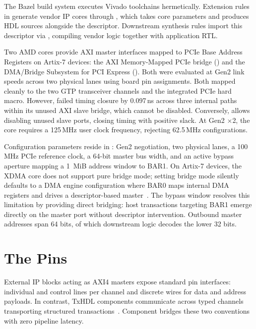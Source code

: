 \documentclass[journal,9pt]{IEEEtran}
\begin{document}
The Bazel build system executes Vivado toolchains hermetically. Extension rules
in  generate vendor IP cores through , which
takes core parameters and produces HDL sources alongside the 
descriptor. Downstream synthesis rules import this descriptor via
, compiling vendor logic together with application RTL.

Two AMD cores provide AXI master interfaces mapped to PCIe Base Address
Registers on Artix-7 devices: the AXI Memory-Mapped PCIe bridge
() and the DMA/Bridge Subsystem for PCI Express ().
Both were evaluated at Gen2 link speeds across two physical lanes using board pin
assignments. Both mapped cleanly to the two GTP transceiver channels and the
integrated PCIe hard macro. However,  failed timing closure by
0.097\,ns across three internal paths within its unused AXI slave bridge, which
cannot be disabled. Conversely,  allows disabling unused slave ports,
closing timing with positive slack. At Gen2 $\times$2, the core requires a
125\,MHz user clock frequency, rejecting 62.5\,MHz configurations.

Configuration parameters reside in : Gen2 negotiation,
two physical lanes, a 100\,MHz PCIe reference clock, a 64-bit master bus width,
and an active bypass aperture mapping a 1~MiB address window to BAR1. On Artix-7
devices, the XDMA core does not support pure bridge mode; setting bridge mode
silently defaults to a DMA engine configuration where BAR0 maps internal DMA
registers and drives a descriptor-based master~\cite{i451}. The bypass window
resolves this limitation by providing direct bridging: host transactions
targeting BAR1 emerge directly on the  master port without
descriptor intervention. Outbound master addresses span 64 bits, of which
downstream logic decodes the lower 32 bits.

\section{The Pins}
\label{sec:p-pins}

External IP blocks acting as AXI4 masters expose standard pin interfaces:
individual  and  control lines per channel and discrete
wires for data and address payloads. In contrast, TxHDL components communicate
across typed channels transporting structured transactions~\cite{axi}.
Component  bridges these two conventions with zero pipeline latency.
\end{document}

